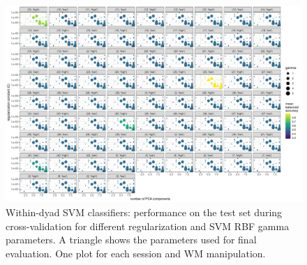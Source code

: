 \begin{figure}[!htpb]
  \includegraphics[angle=90,width=.95\linewidth]{../stats/results/learning_curve_within_dyad.pdf}
  \caption{Within-dyad SVM classifiers: performance on the test set during cross-validation for different regularization and SVM RBF gamma parameters. A triangle shows the parameters used for final evaluation. One plot for each session and WM manipulation.}
  \label{fig:learning_curve_within_dyad}
\end{figure}
